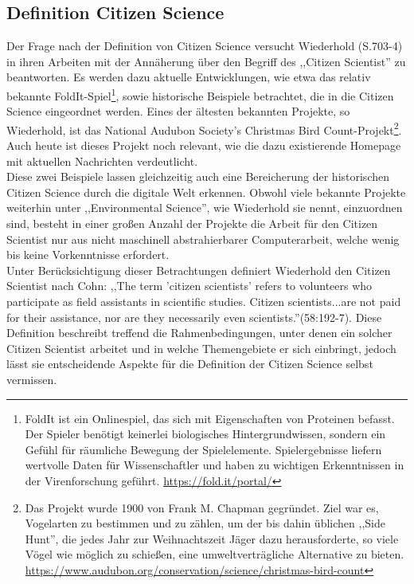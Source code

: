 \documentclass{article}
\begin{document}
\subsection{Definition Citizen Science}
Der Frage nach der Definition von Citizen Science versucht Wiederhold\cite{Wiederhold} (S.703-4) in ihren Arbeiten mit der Annäherung über den Begriff des ,,Citizen Scientist'' zu beantworten.
Es werden dazu aktuelle Entwicklungen, wie etwa das relativ bekannte FoldIt-Spiel\footnote{
FoldIt ist ein Onlinespiel, das sich mit Eigenschaften von Proteinen befasst. Der Spieler benötigt keinerlei biologisches Hintergrundwissen,
sondern ein Gefühl für räumliche Bewegung der Spielelemente.
Spielergebnisse liefern wertvolle Daten für Wissenschaftler und haben zu wichtigen Erkenntnissen in der Virenforschung geführt. \url{https://fold.it/portal/}},
sowie historische Beispiele betrachtet, die in die Citizen Science eingeordnet werden.
Eines der ältesten bekannten Projekte, so Wiederhold, ist das National Audubon Society's Christmas Bird Count-Projekt\footnote{Das Projekt wurde 1900 von Frank M. Chapman gegründet.
Ziel war es, Vogelarten zu bestimmen und zu zählen, um der bis dahin üblichen ,,Side Hunt'',
die jedes Jahr zur Weihnachtszeit Jäger dazu herausforderte, so viele Vögel wie möglich zu schießen,
eine umweltverträgliche Alternative zu bieten. \url{https://www.audubon.org/conservation/science/christmas-bird-count}}.
Auch heute ist dieses Projekt noch relevant, wie die dazu existierende Homepage mit aktuellen Nachrichten verdeutlicht.\\
Diese zwei Beispiele lassen gleichzeitig auch eine Bereicherung der historischen Citizen Science durch die digitale Welt erkennen.
Obwohl viele bekannte Projekte weiterhin unter ,,Environmental Science'', wie Wiederhold sie nennt, einzuordnen sind,
besteht in einer großen Anzahl der Projekte die Arbeit für den Citizen Scientist nur aus nicht maschinell abstrahierbarer Computerarbeit,
welche wenig bis keine Vorkenntnisse erfordert.\\
Unter Berücksichtigung dieser Betrachtungen definiert Wiederhold den Citizen Scientist nach Cohn\cite{Cohn}:
,,The term 'citizen scientists' refers to volunteers who participate as field assistants in scientific studies.
Citizen scientists...are not paid for their assistance, nor are they necessarily even scientists.''(58:192-7).
Diese Definition beschreibt treffend die Rahmenbedingungen, unter denen ein solcher Citizen Scientist arbeitet
und in welche Themengebiete er sich einbringt, jedoch lässt sie entscheidende Aspekte für die Definition der Citizen Science selbst vermissen.\\
\end{document}
